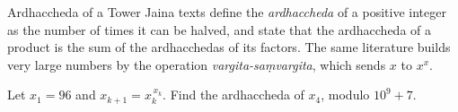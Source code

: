 \begin{problem}{Ardhaccheda of a Tower}
Jaina texts define the \emph{ardhaccheda} of a positive integer as the number of times it can be halved, and state that the ardhaccheda of a product is the sum of the ardhacchedas of its factors. The same literature builds very large numbers by the operation \emph{vargita-saṃvargita}, which sends \(x\) to \(x^x\).
    
Let \(x_1=96\) and \(x_{k+1}=x_k^{\,x_k}\). Find the ardhaccheda of \(x_4\), modulo \(10^9+7\).
\end{problem}
    